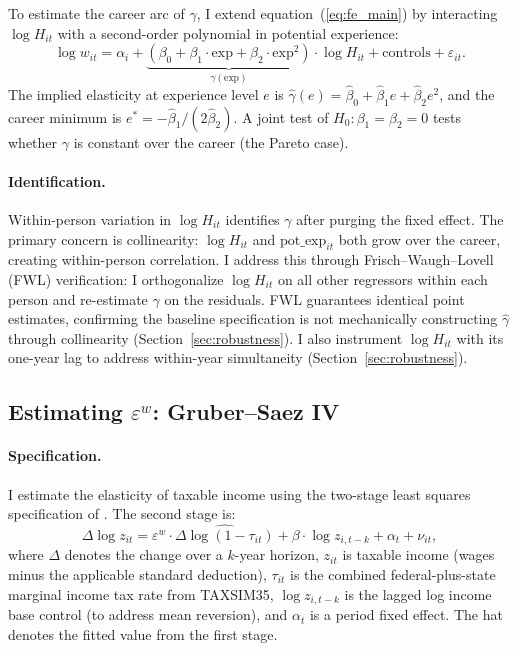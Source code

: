 \documentclass[12pt]{article}
\theoremstyle{definition}
\theoremstyle{remark}
\begin{document}
To estimate the career arc of $\gamma$, I extend equation~(\ref{eq:fe_main}) by interacting
$\log H_{it}$ with a second-order polynomial in potential experience:
\begin{equation}
\label{eq:fe_poly}
\log w_{it} = \alpha_i + \underbrace{(\beta_0 + \beta_1 \cdot \text{exp} + \beta_2 \cdot \text{exp}^2)}_{\gamma(\text{exp})} \cdot \log H_{it}
+ \text{controls} + \varepsilon_{it}.
\end{equation}
The implied elasticity at experience level $e$ is $\hat{\gamma}(e) = \hat{\beta}_0 +
\hat{\beta}_1 e + \hat{\beta}_2 e^2$, and the career minimum is $e^* = -\hat{\beta}_1 /
(2\hat{\beta}_2)$. A joint test of $H_0\colon \beta_1 = \beta_2 = 0$ tests whether $\gamma$
is constant over the career (the Pareto case).

\paragraph{Identification.} Within-person variation in $\log H_{it}$ identifies $\gamma$
after purging the fixed effect. The primary concern is collinearity: $\log H_{it}$ and
$\text{pot\_exp}_{it}$ both grow over the career, creating within-person correlation. I
address this through Frisch--Waugh--Lovell (FWL) verification: I orthogonalize $\log H_{it}$
on all other regressors within each person and re-estimate $\gamma$ on the residuals. FWL
guarantees identical point estimates, confirming the baseline specification is not mechanically
constructing $\hat{\gamma}$ through collinearity (Section~\ref{sec:robustness}). I also
instrument $\log H_{it}$ with its one-year lag to address within-year simultaneity
(Section~\ref{sec:robustness}).

\subsection{Estimating $\varepsilon^w$: Gruber--Saez IV}

\paragraph{Specification.} I estimate the elasticity of taxable income using the
two-stage least squares specification of \citet{gruber2002elasticity}. The second stage is:
\begin{equation}
\label{eq:eti}
\Delta \log z_{it} = \varepsilon^w \cdot \widehat{\Delta \log(1 - \tau_{it})} + \beta \cdot \log z_{i,t-k} + \alpha_t + \nu_{it},
\end{equation}
where $\Delta$ denotes the change over a $k$-year horizon, $z_{it}$ is taxable income (wages
minus the applicable standard deduction), $\tau_{it}$ is the combined federal-plus-state
marginal income tax rate from TAXSIM35, $\log z_{i,t-k}$ is the lagged log income base
control (to address mean reversion), and $\alpha_t$ is a period fixed effect. The hat
denotes the fitted value from the first stage.
\end{document}
